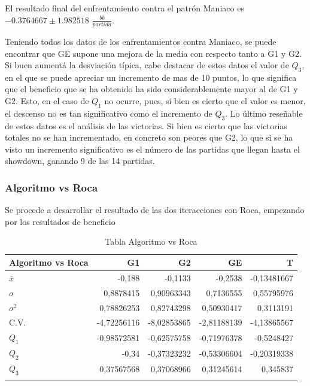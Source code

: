 El resultado final del enfrentamiento contra el patrón Maniaco es $-0.3764667\pm1.982518$ $\frac{bb}{partida}$.

\vspace{5mm} %

Teniendo todos los datos de los enfrentamientos contra Maniaco, se puede encontrar que GE supone una mejora de la media con respecto tanto a G1 y G2. Si buen aumentá la desviación típica, cabe destacar de estos datos el valor de $Q_3$, en el que se puede apreciar un incremento de mas de 10 puntos, lo que significa que el beneficio que se ha obtenido ha sido considerablemente mayor al de G1 y G2. Esto, en el caso de $Q_1$ no ocurre, pues, si bien es cierto que el valor es menor, el descenso no es tan significativo como el incremento de $Q_3$. 
Lo último reseñable de estos datos es el análisis de las victorias. 
Si bien es cierto que las victorias totales no se han incrementado, en concreto son peores que G2, lo que si se ha visto un incremento significativo es el número de las partidas que llegan hasta el showdown, ganando 9 de las 14 partidas. 

\clearpage

\subsubsection{Algoritmo vs Roca}

Se procede a desarrollar el resultado de las dos iteracciones con Roca, empezando por los resultados de beneficio

\begin{longtable}[c]{lrrrr}
\hline
Algoritmo vs Roca & G1 & G2 & GE & T \\ \hline
$\bar{x}$ & -0,188 & -0,1133 & -0,2538 & -0,13481667 \\ 
$\sigma$ & 0,8878415 & 0,90963343 & 0,7136555 & 0,55795976 \\
$\sigma^2$& 0,78826253 & 0,82743298 & 0,50930417 & 0,3113191 \\
C.V. & -4,72256116 & -8,02853865 & -2,81188139 & -4,13865567 \\ 
$Q_1$ & -0,98572581 & -0,62575758 & -0,71976378 & -0,5248427 \\ 
$Q_2$ & -0,34 & -0,37323232 & -0,53306604 & -0,20319338 \\ 
$Q_3$ & 0,37567568 & 0,37068966 & 0,31245614 & 0,345837 \\ \hline
\caption{Tabla Algoritmo vs Roca}
\label{tab:AvR}
\end{longtable}



